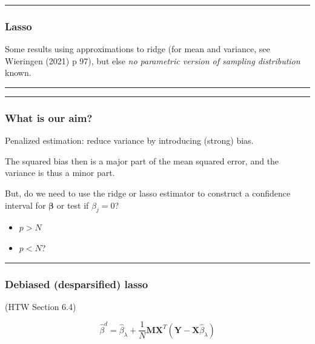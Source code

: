 \documentclass[
  letterpaper,
  DIV=11,
  numbers=noendperiod]{scrartcl}
\providecommand{\tightlist}{%
  \setlength{\itemsep}{0pt}\setlength{\parskip}{0pt}}\usepackage{longtable,booktabs,array}
\begin{document}
\begin{center}\rule{0.5\linewidth}{0.5pt}\end{center}

\hypertarget{lasso}{%
\subsubsection{Lasso}\label{lasso}}

Some results using approximations to ridge (for mean and variance, see
Wieringen (2021) p 97), but else \emph{no parametric version of sampling
distribution} known.

\begin{center}\rule{0.5\linewidth}{0.5pt}\end{center}

\begin{center}\rule{0.5\linewidth}{0.5pt}\end{center}

\hypertarget{what-is-our-aim}{%
\subsubsection{What is our aim?}\label{what-is-our-aim}}

Penalized estimation: reduce variance by introducing (strong) bias.

The squared bias then is a major part of the mean squared error, and the
variance is thus a minor part.

But, do we need to use the ridge or lasso estimator to construct a
confidence interval for \(\boldsymbol \beta\) or test if \(\beta_j=0\)?

\begin{itemize}
\tightlist
\item
  \(p>N\)
\item
  \(p<N\)?
\end{itemize}

\begin{center}\rule{0.5\linewidth}{0.5pt}\end{center}

\hypertarget{debiased-desparsified-lasso}{%
\subsubsection{Debiased (desparsified)
lasso}\label{debiased-desparsified-lasso}}

(HTW Section 6.4)

\[\hat{\beta}^d=\hat{\beta}_{\lambda}+\frac{1}{N}{\boldsymbol M}{\boldsymbol X}^T(\boldsymbol Y-\boldsymbol X \hat{\beta}_{\lambda})\]
\end{document}
